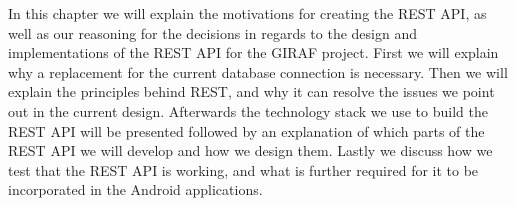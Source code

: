In this chapter we will explain the motivations for creating the REST API, as well as our reasoning for the decisions in regards to the design and implementations of the REST API for the GIRAF project.
First we will explain why a replacement for the current database connection is necessary.
Then we will explain the principles behind REST, and why it can resolve the issues we point out in the current design.
Afterwards the technology stack we use to build the REST API will be presented followed by an explanation of which parts of the REST API we will develop and how we design them.
Lastly we discuss how we test that the REST API is working, and what is further required for it to be incorporated in the Android applications.